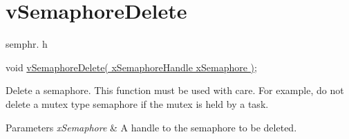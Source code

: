 \hypertarget{group__vSemaphoreDelete}{}\section{v\+Semaphore\+Delete}
\label{group__vSemaphoreDelete}
semphr. h 
\begin{DoxyPre}void \hyperlink{semphr_8h_acd7d0eda0923d7caeeaaee9202c43eab}{vSemaphoreDelete( xSemaphoreHandle xSemaphore )};\end{DoxyPre}


Delete a semaphore. This function must be used with care. For example, do not delete a mutex type semaphore if the mutex is held by a task.


\begin{DoxyParams}{Parameters}
{\em x\+Semaphore} & A handle to the semaphore to be deleted. \\
\hline
\end{DoxyParams}
